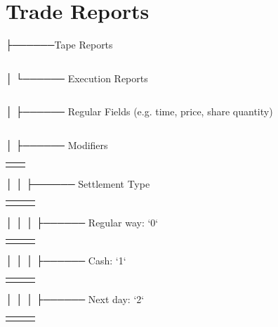 \documentclass[11pt]{article}
\begin{document}
\section{Trade Reports}
\label{sec:org9b11340}
├──────Tape Reports
\begin{center}
\begin{tabular}{l}
\\[0pt]
\end{tabular}
\end{center}
│   └────── Execution Reports
\begin{center}
\begin{tabular}{l}
\\[0pt]
\end{tabular}
\end{center}
│       ├────── Regular Fields (e.g. time, price, share quantity)
\begin{center}
\begin{tabular}{l}
\\[0pt]
\end{tabular}
\end{center}
│       ├────── Modifiers
\begin{center}
\begin{tabular}{ll}
 & \\[0pt]
\end{tabular}
\end{center}
│       │   ├────── Settlement Type
\begin{center}
\begin{tabular}{lll}
 &  & \\[0pt]
\end{tabular}
\end{center}
│       │   │   ├────── Regular way: `0`
\begin{center}
\begin{tabular}{lll}
 &  & \\[0pt]
\end{tabular}
\end{center}
│       │   │   ├────── Cash: `1`
\begin{center}
\begin{tabular}{lll}
 &  & \\[0pt]
\end{tabular}
\end{center}
│       │   │   ├────── Next day: `2`
\begin{center}
\begin{tabular}{lll}
 &  & \\[0pt]
\end{tabular}
\end{center}
\end{document}
